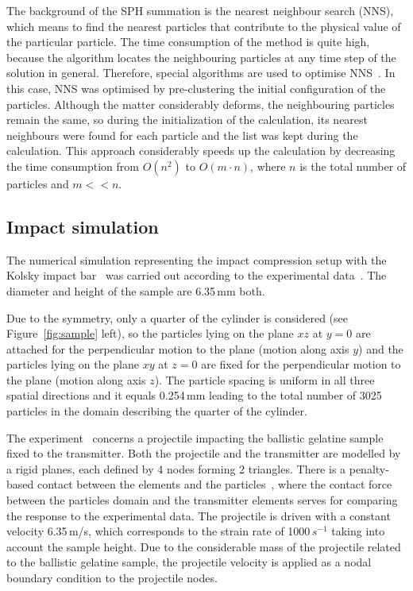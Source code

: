 \documentclass{svproc}
\newcommand{\unit}[2]{#1\,#2}
\newcommand{\revb}[1]{{\color{black}#1}}
\begin{document}
The background of the SPH summation is the nearest neighbour search (NNS), which means to find the nearest particles that contribute to the physical value of the particular particle. The time consumption of the method is quite high, because the algorithm locates the neighbouring particles at any time step of the solution in general. Therefore, special algorithms are used to optimise NNS~\cite{Dominguez:2011}. In this case, NNS was optimised by pre-clustering the initial configuration of the particles. Although the matter considerably deforms, the neighbouring particles remain the same, so during the initialization of the calculation, its nearest neighbours were found for each particle and the list was kept during the calculation. This approach considerably speeds up the calculation by decreasing the time consumption from $O(n^2)$ to $O(m\cdot n)$, where $n$ is the total number of particles and $m<<n$.
%
\subsection{Impact simulation}
%
The numerical simulation representing the impact compression setup with the Kolsky impact bar~\cite{Kolsky:1949} was carried out according to the experimental data~\cite{Casem:2014}. The diameter and height of the sample are \unit{6.35}{mm} both.

Due to the symmetry, only a quarter of the cylinder is considered (see Figure~\revb{\ref{fig:sample}} left), so the particles lying on the plane $xz$ at $y=0$ are attached for the perpendicular motion to the plane (motion along axis $y$) and the particles lying on the plane $xy$ at $z=0$ are fixed for the perpendicular motion to the plane (motion along axis $z$). The particle spacing is uniform in all three spatial directions and it equals \unit{0.254}{mm} leading to the total number of 3025 particles in the domain describing the quarter of the cylinder.

The experiment~\cite{Casem:2014} concerns a projectile impacting the ballistic gelatine sample fixed to the transmitter. Both the projectile and the transmitter are modelled by a rigid planes, each defined by 4 nodes forming 2 triangles. There is a penalty-based contact between the elements and the particles~\cite{Hyncik:2002}, where the contact force between the particles domain and the transmitter elements serves for comparing the response to the experimental data. The projectile is driven with a constant velocity \unit{6.35}{m/s}, which corresponds to the strain rate of \unit{1000}{$s^{-1}$} taking into account the sample height. Due to the considerable mass of the projectile related to the ballistic gelatine sample, the projectile velocity is applied as a nodal boundary condition to the projectile nodes. 
\end{document}
